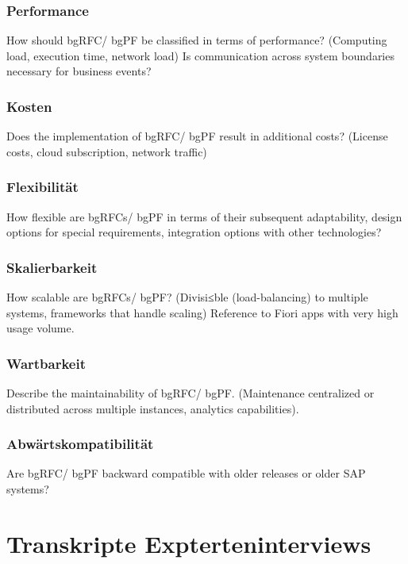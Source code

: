 \subsubsection{Performance}

How should bgRFC/ bgPF be classified in terms of performance? (Computing load, execution time, network load) Is communication across system boundaries necessary for business events?

\subsubsection{Kosten}

Does the implementation of bgRFC/ bgPF result in additional costs? (License costs, cloud subscription, network traffic)

\subsubsection{Flexibilität}

How flexible are bgRFCs/ bgPF in terms of their subsequent adaptability, design options for special requirements, integration options with other technologies?

\subsubsection{Skalierbarkeit}

How scalable are bgRFCs/ bgPF? (Divisi≤ble (load-balancing) to multiple systems, frameworks that handle scaling) Reference to Fiori apps with very high usage volume.

\subsubsection{Wartbarkeit}

Describe the maintainability of bgRFC/ bgPF. (Maintenance centralized or distributed across multiple instances, analytics capabilities).

\subsubsection{Abwärtskompatibilität}

Are bgRFC/ bgPF backward compatible with older releases or older SAP systems?

\section*{Transkripte Expterteninterviews}

